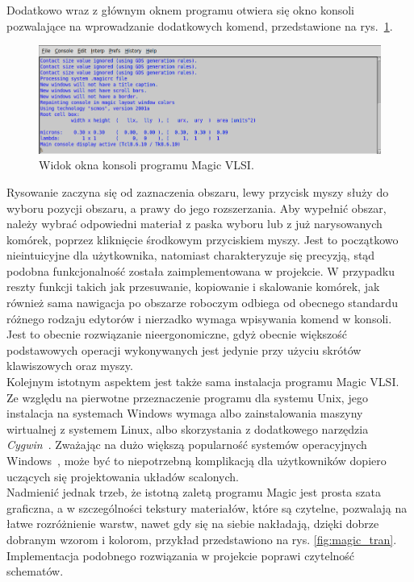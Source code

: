 \indent Dodatkowo wraz z głównym oknem programu otwiera się okno konsoli pozwalające na wprowadzanie dodatkowych komend,
przedstawione na rys.~\ref{fig:magic_konsola}.

\begin{figure}[h]
    \centering
    \includegraphics[width=.8\textwidth]{chapters/chapter2/img/magic_okno_konsola}
    \caption{Widok okna konsoli programu Magic VLSI.}
    \label{fig:magic_konsola}
\end{figure}

\indent Rysowanie zaczyna się od zaznaczenia obszaru, lewy przycisk myszy służy do wyboru pozycji obszaru,
a prawy do jego rozszerzania.
Aby wypełnić obszar, należy wybrać odpowiedni materiał z paska wyboru
lub z już narysowanych komórek,
poprzez kliknięcie środkowym przyciskiem myszy.
Jest to początkowo nieintuicyjne dla użytkownika,
natomiast charakteryzuje się precyzją, stąd podobna funkcjonalność została zaimplementowana w projekcie.
W przypadku reszty funkcji takich jak przesuwanie, kopiowanie i skalowanie komórek,
jak również sama nawigacja po obszarze roboczym odbiega od obecnego standardu różnego rodzaju edytorów
i nierzadko wymaga wpisywania komend w konsoli.
Jest to obecnie rozwiązanie nieergonomiczne, gdyż obecnie większość podstawowych operacji wykonywanych jest
jedynie przy użyciu skrótów klawiszowych oraz myszy.\\
\indent Kolejnym istotnym aspektem jest także sama instalacja programu Magic VLSI\@.
Ze względu na pierwotne przeznaczenie programu dla systemu Unix,
jego instalacja na systemach Windows wymaga albo zainstalowania maszyny wirtualnej z systemem Linux,
albo skorzystania z dodatkowego narzędzia \textit{Cygwin}~\cite{MAGIC_site,cygwin}.
Zważając na dużo większą popularność systemów operacyjnych Windows~\cite{os_stats},
może być to niepotrzebną komplikacją dla użytkowników dopiero uczących się projektowania układów scalonych.\\
\indent Nadmienić jednak trzeb, że istotną zaletą programu Magic jest prosta szata graficzna,
a w szczególności tekstury materiałów, które są czytelne, pozwalają na łatwe rozróżnienie warstw,
nawet gdy się na siebie nakładają, dzięki dobrze dobranym wzorom i kolorom, przykład przedstawiono na rys. \ref{fig:magic_tran}.
Implementacja podobnego rozwiązania w projekcie poprawi czytelność schematów.

